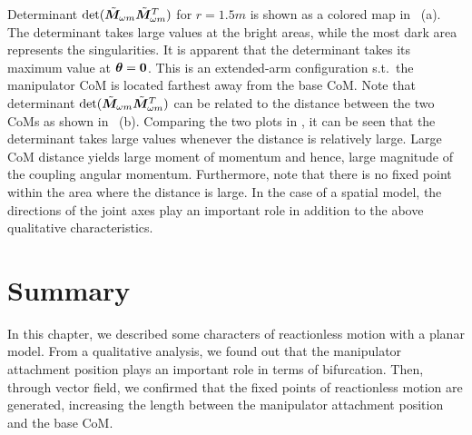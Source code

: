 %
Determinant $\det ({\tilde{\bm{M}}}_{\omega m}{\tilde{\bm{M}}}_{\omega m}^{T})$
for  $r = 1.5\unit{m}$ is shown as a colored map in ~(a).
The determinant takes large values at the bright areas, 
while the most dark area represents the singularities.
It is apparent that the determinant takes its maximum value at ${\bm{\theta}} = \bm 0$.
This is an extended-arm configuration s.t.\ the manipulator CoM is located farthest away 
from the base CoM. Note that determinant $\det({\tilde{\bm{M}}}_{\omega m}{\tilde{\bm{M}}}_{\omega m}^{T})$ can be 
related to the distance between the two CoMs as shown in
~(b). Comparing the two plots in , it can be seen that the determinant
takes large values whenever the distance is relatively large. Large CoM distance yields 
large  moment of  momentum and hence, large magnitude of the coupling angular momentum.  
Furthermore, note that there is no fixed point within the area where the distance is large.
In the case of a spatial model, the directions  of the joint axes play an 
important role in addition to the above qualitative characteristics. 

\section{Summary}
In this chapter,
we described some characters of reactionless motion with a planar model.
From a qualitative analysis,
we found out that the manipulator attachment position plays an important role
in terms of bifurcation.
Then, through vector field,
we confirmed that the fixed points of reactionless motion are generated,
increasing the length between the manipulator attachment position and the base CoM.







%
%
